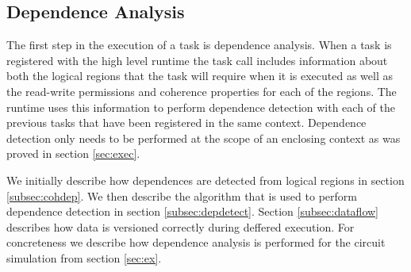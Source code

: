 \subsection{Dependence Analysis} 
\label{subsec:depanalysis}
The first step in the execution of a task is dependence analysis.  When
a task is registered with the high level runtime the task call includes
information about both the logical regions that the task will require
when it is executed as well as the read-write permissions and coherence properties
for each of the regions.  The runtime uses this information to perform
dependence detection with each of the previous tasks that have been registered
in the same context.  Dependence detection only needs to be performed at
the scope of an enclosing context as was proved in section \ref{sec:exec}. 

We initially describe how dependences are detected from logical regions
in section \ref{subsec:cohdep}.  We then describe the algorithm that
is used to perform dependence detection in section \ref{subsec:depdetect}.
Section \ref{subsec:dataflow} describes how data is versioned correctly
during deffered execution.  For concreteness we describe how dependence
analysis is performed for the circuit simulation from section \ref{sec:ex}.



